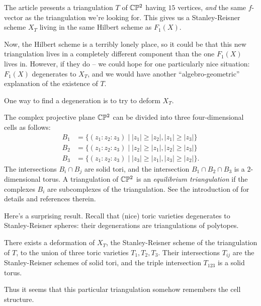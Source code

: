 \documentclass[11pt, english]{article}
\begin{document}
The article \cite{gaifullin_triangulation} presents a triangulation $T$ of $\mathbb{C} \mathbb{P}^2$ having $15$ vertices, \emph{and} the same $f$-vector as the triangulation we're looking for. This gives us a Stanley-Reisner scheme $X_T$ living in the same Hilbert scheme as $F_1(X)$.

Now, the Hilbert scheme is a terribly lonely place, so it could be that this new triangulation lives in a completely different component than the one $F_1(X)$ lives in. However, if they do -- we could hope for one particularly nice situation: $F_1(X)$ degenerates to $X_T$, and we would have another ``algebro-geometric'' explanation of the existence of $T$.

One way to find a degeneration is to try to deform $X_T$.

\begin{remark}
The complex projective plane $\mathbb{C} \mathbb{P}^2$ can be divided into three four-dimensional cells as follows:
\begin{align*}
  B_1 &= \{ (z_1:z_2:z_3) \mid \lvert z_1 \rvert \geq \lvert z_2 \rvert, \lvert z_1 \rvert \geq  \lvert z_3 \rvert \} \\
  B_2 &= \{ (z_1:z_2:z_3) \mid \lvert z_2 \rvert \geq \lvert z_1 \rvert, \lvert z_2 \rvert \geq  \lvert z_3 \rvert \} \\
  B_3 &= \{ (z_1:z_2:z_3) \mid \lvert z_3 \rvert \geq \lvert z_1 \rvert, \lvert z_3 \rvert \geq  \lvert z_2 \rvert \}.
\end{align*}
The intersections $B_i \cap B_j$ are solid tori, and the intersection $B_1 \cap B_2 \cap B_3$ is a $2$-dimensional torus. A triangulation of $\mathbb{C} \mathbb{P}^2$ is an \emph{equilibrium triangulation} if the complexes $B_i$ are subcomplexes of the triangulation. See the introduction of \cite{gaifullin_triangulation} for details and references therein.
\end{remark} 

Here's a surprising result. Recall that (nice) toric varieties degenerates to Stanley-Reisner spheres: their degenerations are triangulations of polytopes. 

\begin{prop}
\label{defT}
 There exists a deformation of $X_T$, the Stanley-Reisner scheme of the triangulation of $T$, to the union of three toric varieties $T_1,T_2,T_3$. Their intersections $T_{ij}$ are the Stanley-Reisner schemes of solid tori, and the triple intersection $T_{123}$ is a solid torus. 
\end{prop}
Thus it seems that this particular triangulation somehow remembers the cell structure.
\end{document}
